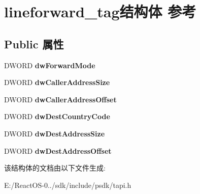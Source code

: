 \hypertarget{structlineforward__tag}{}\section{lineforward\+\_\+tag结构体 参考}
\label{structlineforward__tag}
\subsection*{Public 属性}
\begin{DoxyCompactItemize}
\item 
\mbox{\label{structlineforward__tag_a0bb3dc401bdaf3cb05220f3be3dfd723}} 
D\+W\+O\+RD {\bfseries dw\+Forward\+Mode}
\item 
\mbox{\label{structlineforward__tag_ab1230256716df6e2558ba29a47110fe9}} 
D\+W\+O\+RD {\bfseries dw\+Caller\+Address\+Size}
\item 
\mbox{\label{structlineforward__tag_a85fb8c0c0676e6b5bb838f4389c448c0}} 
D\+W\+O\+RD {\bfseries dw\+Caller\+Address\+Offset}
\item 
\mbox{\label{structlineforward__tag_a102948d41ee72c7fed77fec538323bc3}} 
D\+W\+O\+RD {\bfseries dw\+Dest\+Country\+Code}
\item 
\mbox{\label{structlineforward__tag_a2dbc3dfdbcd59dde513a19fbdad5de53}} 
D\+W\+O\+RD {\bfseries dw\+Dest\+Address\+Size}
\item 
\mbox{\label{structlineforward__tag_a2893ba2d3ae8056dfb043f63d3d10c63}} 
D\+W\+O\+RD {\bfseries dw\+Dest\+Address\+Offset}
\end{DoxyCompactItemize}


该结构体的文档由以下文件生成\+:\begin{DoxyCompactItemize}
\item 
E\+:/\+React\+O\+S-\/0../sdk/include/psdk/tapi.\+h\end{DoxyCompactItemize}
